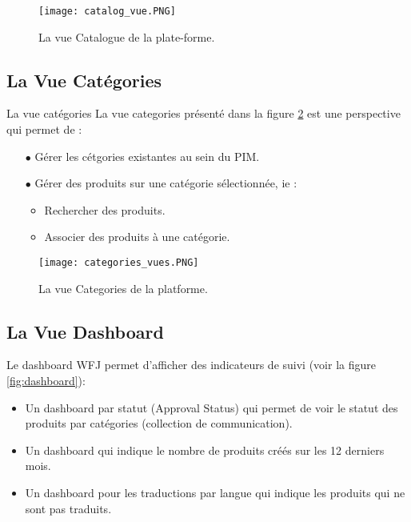 \begin{figure}[ht]
  \centering
  \texttt{[image: catalog\_vue.PNG]}
  \caption{La vue Catalogue de la plate-forme.}
  \label{fig:ctalog}
\end{figure}
\FloatBarrier

\subsection{La Vue Catégories}

La vue catégories La vue categories présenté dans la figure \ref{fig:category-vue} est une perspective qui permet de : 

\begin{itemize}
    \item[$\bullet$] Gérer les cétgories existantes au sein du PIM.
    \medskip
    \item[$\bullet$] Gérer des produits sur une catégorie sélectionnée, ie :
    \begin{itemize}
    \smallskip
        \item Rechercher des produits.
        \smallskip
        \item Associer des produits à une catégorie.
    \end{itemize}
\end{itemize}
\begin{figure}[ht]
  \centering
  \texttt{[image: categories\_vues.PNG]}
  \caption{La vue Categories de la platforme.}
  \label{fig:category-vue}
\end{figure}
\FloatBarrier

\subsection{La Vue Dashboard}

Le dashboard WFJ permet d’afficher des indicateurs de suivi (voir la figure \ref{fig:dashboard}):

\begin{itemize}
    \item Un dashboard par statut (Approval Status) qui permet de voir le statut des produits par catégories (collection de communication).
    \smallskip
    \item Un dashboard qui indique le nombre de produits créés sur les 12 derniers mois.
    \smallskip
    \item Un dashboard pour les traductions par langue qui indique les produits qui ne sont pas traduits.
    
\end{itemize}

